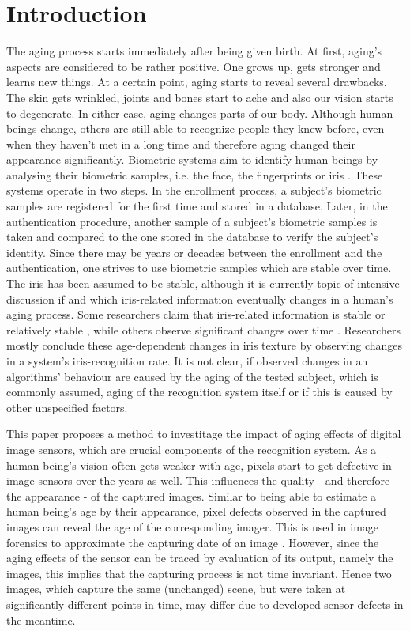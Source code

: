 \documentclass[10pt,twocolumn,letterpaper]{article}
\begin{document}
\section{Introduction}
The aging process starts immediately after being given birth. At first, aging's aspects are considered to be rather positive. One grows up, gets stronger and learns new things. At a certain point, aging starts to reveal several drawbacks. The skin gets wrinkled, joints and bones start to ache and also our vision starts to degenerate. In either case, aging changes parts of our body. Although human beings change, others are still able to recognize people they knew before, even when they haven't met in a long time and therefore aging changed their appearance significantly.
Biometric systems aim to identify human beings by analysing their biometric samples, i.e. the face, the fingerprints or iris \cite{rathgeb}. These systems operate in two steps. In the enrollment process, a subject's biometric samples are registered for the first time and stored in a database. Later, in the authentication procedure, another sample of a subject's biometric samples is taken and compared to the one stored in the database to verify the subject's identity. Since there may be years or decades between the enrollment and the authentication, one strives to use biometric samples which are stable over time. The iris has been assumed to be stable, although it is currently topic of intensive discussion if and which iris-related information eventually changes in a human's aging process. Some researchers claim that iris-related information is stable or relatively stable \cite{daugmanNoChange, Monro}, while others observe significant changes over time \cite{rankinChange, rankinChangeResponse, fenkerIrisAging, czajkaTemplateAging, fairhurstNonstability}. Researchers mostly conclude these age-dependent changes in iris texture by observing changes in a system's iris-recognition rate. It is not clear, if observed changes in an algorithms' behaviour are caused by the aging of the tested subject, which is commonly assumed, aging of the recognition system itself or if this is caused by other unspecified factors.

This paper proposes a method to investitage the impact of aging effects of digital image sensors, which are crucial components of the recognition system. As a human being's vision often gets weaker with age, pixels start to get defective in image sensors over the years as well. This influences the quality - and therefore the appearance - of the captured images. Similar to being able to estimate a human being's age by their appearance, pixel defects observed in the captured images can reveal the age of the corresponding imager. This is used in image forensics to approximate the capturing date of an image \cite{fridrich}. However, since the aging effects of the sensor can be traced by evaluation of its output, namely the images, this implies that the capturing process is not time invariant. Hence two images, which capture the same (unchanged) scene, but were taken at significantly different points in time, may differ due to developed sensor defects in the meantime.
\end{document}
